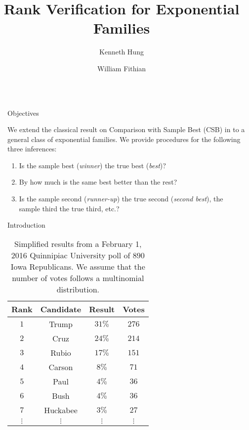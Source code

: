 \documentclass[final]{beamer}
\title{Rank Verification for Exponential Families}
\author{Kenneth Hung \and William Fithian}
\institute{
University of California, Berkeley \\
{\tt \{kenhung, wfithian\}@berkeley.edu}
}
\newlength{\sepwid}
\newlength{\onecolwid}
\begin{document}

\setlength{\belowcaptionskip}{2ex}
\setlength\belowdisplayshortskip{2ex}

\begin{frame}[t]

\begin{columns}[t]

\begin{column}{\sepwid}\end{column}

\begin{column}{\onecolwid}

\begin{alertblock}{Objectives}

We extend the classical result on Comparison with Sample Best (CSB) in \citet{Stefansson:1988wj} to a general class of exponential families. We provide procedures for the following three inferences:
\begin{enumerate}
	\item Is the sample best ({\em winner}) the true best ({\em best})?
	\item By how much is the same best better than the rest?
	\item Is the sample second ({\em runner-up}) the true second ({\em second best}), the sample third the true third, etc.?
\end{enumerate}

\end{alertblock}

\begin{block}{Introduction}

\begin{table}[htbp]
\centering
\begin{tabular}{c c c c}
	\hline
	Rank & Candidate & Result & Votes \\
	\hline
	$1$ & Trump & $31\%$ & $276$ \\
	$2$ & Cruz & $24\%$ & $214$ \\
	$3$ & Rubio & $17\%$ & $151$ \\
	$4$ & Carson & $8\%$ & $71$ \\
	$5$ & Paul & $4\%$ & $36$ \\
	$6$ & Bush & $4\%$ & $36$ \\
	$7$ & Huckabee & $3\%$ & $27$ \\
	$\vdots$ & $\vdots$ & $\vdots $ & $\vdots$ \\
	\hline
\end{tabular}
\caption{Simplified results from a February 1, 2016 Quinnipiac University poll of $890$ Iowa Republicans. We assume that the number of votes follows a multinomial distribution.}
\label{tbl:poll}
\end{table}


\end{block}
\end{column}
\end{columns}
\end{frame}
\end{document}
